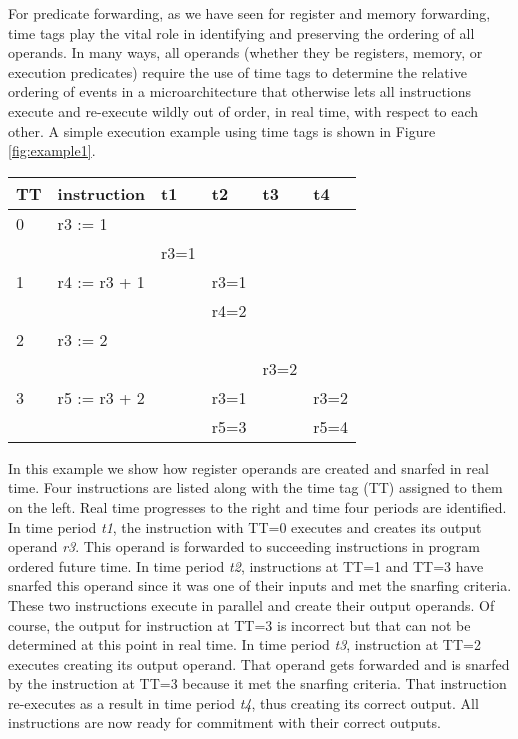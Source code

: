 \documentclass[10pt,twocolumn]{article}
\begin{document}
For predicate forwarding, as we have seen for register and
memory forwarding, time tags play the vital role in
identifying and preserving the ordering of all operands.
In many ways, all operands (whether they be registers, memory,
or execution predicates) require the use of time tags to
determine the relative ordering of events in a microarchitecture
that otherwise lets all instructions execute and re-execute
wildly out of order, in real time, with respect to each other.
A simple execution example using time tags 
is shown in Figure \ref{fig:example1}.
%
\begin{figure*}
\centering
\begin{tabular}{|l|l|l|l|l|l|}
\hline
TT&instruction&t1&t2&t3&t4\\
\hline 
\hline 
0&r3 := 1&&&~~~~&\\
&&r3=1&&&\\
\hline 
1&r4 := r3 + 1&&r3=1&&~~~~\\
&&&r4=2&&\\
\hline 
2&r3 := 2&&&&~~~~\\
&&&&r3=2&\\
\hline 
3&r5 := r3 + 2&&r3=1&&r3=2\\
&&&r5=3&&r5=4\\
\hline 
\end{tabular}
\caption{{\em Example Instruction Execution.} The time tags for sequential
program instructions are on the left.  Real time is shown advancing
along the top.  For each real time interval, input operands are shown
above any output operands.}
\label{fig:example1}
\end{figure*}
%
In this example we show how register operands are created and
snarfed in real time.
Four instructions are listed along with the time tag (TT) assigned to them
on the left.  Real time progresses to the right and time four periods
are identified.  In time period \textit{t1}, the instruction with 
TT=0 executes and creates its output operand \textit{r3}.
This operand is forwarded to succeeding instructions in program
ordered future time.  In time period \textit{t2}, instructions
at TT=1 and TT=3 have snarfed this operand since it was one of
their inputs and met the snarfing criteria.  
These two instructions execute in parallel and
create their output operands.  Of course, the output for
instruction at TT=3 is incorrect but that can not be determined
at this point in real time.  In time period \textit{t3},
instruction at TT=2 executes creating its output operand.
That operand gets forwarded and is snarfed by the instruction at
TT=3 because it met the snarfing criteria.  That instruction
re-executes as a result in time period \textit{t4}, thus
creating its correct output.  All instructions are now ready
for commitment with their correct outputs.
%
%
\vspace{-0.25in}
\end{document}
